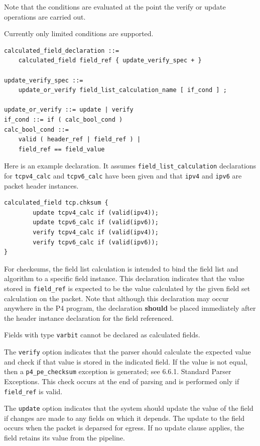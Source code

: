 \documentclass[12pt]{article}
\begin{document}
Note that the conditions are evaluated at the point the verify or
update operations are carried out.

Currently only limited conditions are supported.

\begin{lstlisting}[style=BNFstyle]
calculated_field_declaration ::=
    calculated_field field_ref { update_verify_spec + }

update_verify_spec ::=
    update_or_verify field_list_calculation_name [ if_cond ] ;

update_or_verify ::= update | verify
if_cond ::= if ( calc_bool_cond )
calc_bool_cond ::=
    valid ( header_ref | field_ref ) |
    field_ref == field_value
\end{lstlisting}

Here is an example declaration. It assumes \texttt{field_list_calculation} declarations 
for \texttt{tcpv4_calc} and \texttt{tcpv6_calc} have been given and that \texttt{ipv4} and \texttt{ipv6} are 
packet header instances.

\begin{lstlisting}[style=P4style]
calculated_field tcp.chksum {
        update tcpv4_calc if (valid(ipv4));
        update tcpv6_calc if (valid(ipv6));
        verify tcpv4_calc if (valid(ipv4));
        verify tcpv6_calc if (valid(ipv6));
}
\end{lstlisting}

For checksums, the field list calculation is intended to bind the field list 
and algorithm to a specific field instance. This declaration indicates that 
the value stored in \texttt{field_ref} is expected to be the value calculated by the 
given field set calculation on the packet. Note that although this declaration 
may occur anywhere in the P4 program, the declaration \textbf{should} be placed immediately 
after the header instance declaration for the field referenced.

Fields with type \texttt{varbit} cannot be declared as calculated fields.

The \texttt{verify} option indicates that the parser should calculate the expected 
value and check if that value is stored in the indicated field. If the value 
is not equal, then a \texttt{p4_pe_checksum} exception is generated; see 6.6.1. 
Standard Parser Exceptions. This check occurs at the end of parsing and is 
performed only if \texttt{field_ref} is valid.

The \texttt{update} option indicates that the system should update the value of the 
field if changes are made to any fields on which it depends. The update to 
the field occurs when the packet is deparsed for egress. If no update clause 
applies, the field retains its value from the \matchaction pipeline.
\end{document}
